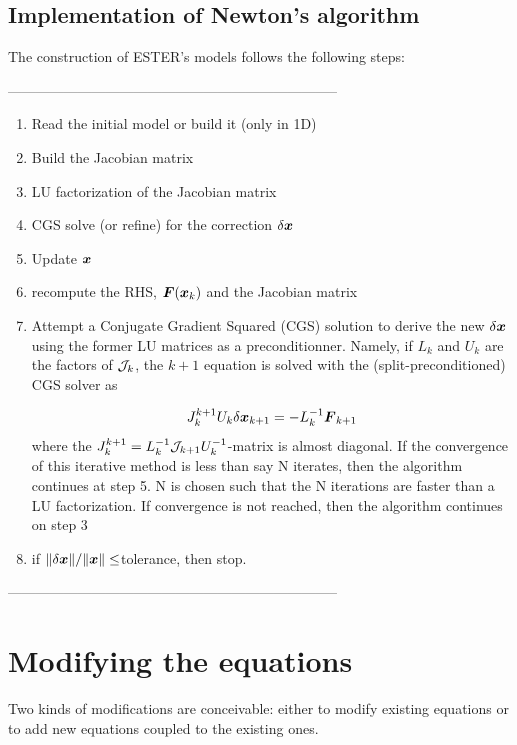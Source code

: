 \subsection{Implementation of Newton's algorithm}

The construction of ESTER's models follows the following steps:


\noindent -----------------------------------------------------------------------
\begin{enumerate}

\item Read the initial model or build it (only in 1D)
\item Build the Jacobian matrix
\item LU factorization of the Jacobian matrix
\item CGS solve (or refine) for the correction $\delta\vx$
\item Update $\vx$
\item recompute the RHS, $\vF(\vx_k)$ and the Jacobian matrix
\item Attempt a Conjugate Gradient Squared (CGS) solution to derive the new
$\delta\vx$ using the former LU matrices as a preconditionner. Namely,
if $L_k$ and $U_k$ are the factors of $\mathcal{J}_k$, the $k+1$ equation is
solved with the (split-preconditioned) CGS solver as

\[ J_k^{k+1}U_k\delta\vx_{k+1} = -L_k^{-1}\vF_{k+1}  \]
where the $J_k^{k+1}=L_k^{-1}\mathcal{J}_{k+1}U_k^{-1}$-matrix is almost
diagonal. If the convergence of this iterative method is less than say N
iterates, then the algorithm continues at step 5. N is chosen such that
the N iterations are faster than a LU factorization. If convergence is
not reached, then the algorithm continues on step 3

\item if $\|\delta\vx\|/\|\vx\|\leq$tolerance, then stop.
\end{enumerate}
\noindent -----------------------------------------------------------------------

\section{Modifying the equations}

Two kinds of modifications are conceivable: either to modify existing
equations or to add new equations coupled to the existing ones.

